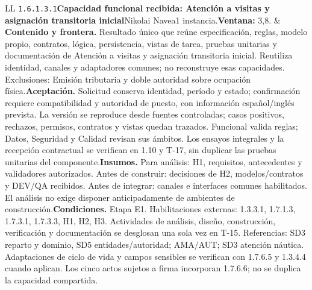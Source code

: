 \begin{longtable}{L{\tabcolsep\relax}L{\tabcolsep\relax}}
\texttt{1.\allowbreak{}6.\allowbreak{}1.\allowbreak{}3.\allowbreak{}1}\newline{}\textbf{Capacidad funcional recibida: Atención a visitas y asignación transitoria inicial}\newline{}Nikolai Navea\newline{}1 instancia.\newline{}\textbf{Ventana:} 3,8. & \textbf{Contenido y frontera.} Resultado único que reúne especificación, reglas, modelo propio, contratos, lógica, persistencia, vistas de tarea, pruebas unitarias y documentación de Atención a visitas y asignación transitoria inicial. Reutiliza identidad, canales y adaptadores comunes; no reconstruye esas capacidades. Exclusiones: Emisión tributaria y doble autoridad sobre ocupación física.\newline{}\textbf{Aceptación.} Solicitud conserva identidad, período y estado; confirmación requiere compatibilidad y autoridad de puesto, con información español/inglés prevista. La versión se reproduce desde fuentes controladas; casos positivos, rechazos, permisos, contratos y vistas quedan trazados. Funcional valida reglas; Datos, Seguridad y Calidad revisan sus ámbitos. Los ensayos integrales y la recepción contractual se verifican en 1.10 y T-17, sin duplicar las pruebas unitarias del componente.\newline{}\textbf{Insumos.} Para análisis: H1, requisitos, antecedentes y validadores autorizados. Antes de construir: decisiones de H2, modelos/contratos y DEV/QA recibidos. Antes de integrar: canales e interfaces comunes habilitados. El análisis no exige disponer anticipadamente de ambientes de construcción.\newline{}\textbf{Condiciones.} Etapa E1. Habilitaciones externas: 1.3.3.1, 1.7.1.3, 1.7.3.1, 1.7.3.3, H1, H2, H3. Actividades de análisis, diseño, construcción, verificación y documentación se desglosan una sola vez en T-15. Referencias: SD3 reparto y dominio, SD5 entidades/autoridad; AMA/AUT; SD3 atención náutica. Adaptaciones de ciclo de vida y campos sensibles se verifican con 1.7.6.5 y 1.3.4.4 cuando aplican. Los cinco actos sujetos a firma incorporan 1.7.6.6; no se duplica la capacidad compartida.\\\hline

\end{longtable}
